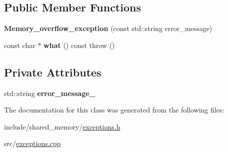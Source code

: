 \subsection*{Public Member Functions}
\begin{DoxyCompactItemize}
\item 
{\bfseries Memory\+\_\+overflow\+\_\+exception} (const std\+::string error\+\_\+message)\hypertarget{classshared__memory_1_1Memory__overflow__exception_aed67eae5c2822873debe5eb8a7427c0b}{}\label{classshared__memory_1_1Memory__overflow__exception_aed67eae5c2822873debe5eb8a7427c0b}

\item 
const char $\ast$ {\bfseries what} () const   throw ()\hypertarget{classshared__memory_1_1Memory__overflow__exception_a378f3443041b2f5fd52e2fd0231d5aea}{}\label{classshared__memory_1_1Memory__overflow__exception_a378f3443041b2f5fd52e2fd0231d5aea}

\end{DoxyCompactItemize}
\subsection*{Private Attributes}
\begin{DoxyCompactItemize}
\item 
std\+::string {\bfseries error\+\_\+message\+\_\+}\hypertarget{classshared__memory_1_1Memory__overflow__exception_ad63afdde056259c8fb0bd3212031783d}{}\label{classshared__memory_1_1Memory__overflow__exception_ad63afdde056259c8fb0bd3212031783d}

\end{DoxyCompactItemize}


The documentation for this class was generated from the following files\+:\begin{DoxyCompactItemize}
\item 
include/shared\+\_\+memory/\hyperlink{exceptions_8h}{exceptions.\+h}\item 
src/\hyperlink{exceptions_8cpp}{exceptions.\+cpp}\end{DoxyCompactItemize}
